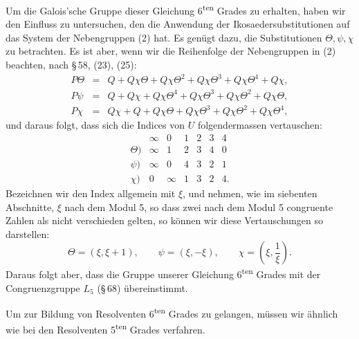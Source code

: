 \documentclass[11pt]{article}
\begin{document}
Um die Galois'sche Gruppe dieser Gleichung 6\textsuperscript{ten} Grades zu erhalten, haben wir den Einfluss zu untersuchen, den die Anwendung der Ikosaedersubstitutionen auf das System der Nebengruppen (2) hat. Es genügt dazu, die Substitutionen \(\Theta,\psi,\chi\) zu betrachten. Es ist aber, wenn wir die Reihenfolge der Nebengruppen in (2) beachten, nach \S\,58, (23), (25):
\[
\begin{array}{rcl}
P\Theta&=&Q+Q\chi\Theta+Q\chi\Theta^2+Q\chi\Theta^3+Q\chi\Theta^4+Q\chi,\\
P\psi&=&Q+Q\chi+Q\chi\Theta^4+Q\chi\Theta^3+Q\chi\Theta^2+Q\chi\Theta,\\
P\chi&=&Q\chi+Q+Q\chi\Theta+Q\chi\Theta^3+Q\chi\Theta^2+Q\chi\Theta^4,
\end{array}
\]
und daraus folgt, dass sich die Indices von \(U\) folgendermassen vertauschen:
\[
\begin{array}{c|rrrrrr}
&\infty&0&1&2&3&4\\\hline
\Theta)&\infty&1&2&3&4&0\\
\psi)&\infty&0&4&3&2&1\\
\chi)&0&\infty&1&3&2&4.
\end{array}
\]
Bezeichnen wir den Index allgemein mit \(\xi\), und nehmen, wie im siebenten Abschnitte, \(\xi\) nach dem Modul 5, so dass zwei nach dem Modul 5 congruente Zahlen als nicht verschieden gelten, so können wir diese Vertauschungen so darstellen:
\[
\Theta=(\xi,\xi+1),
\qquad
\psi=(\xi,-\xi),
\qquad
\chi=\left(\xi,\frac1\xi\right).
\]
Daraus folgt aber, dass die Gruppe unserer Gleichung 6\textsuperscript{ten} Grades mit der Congruenzgruppe \(L_5\) (\S\,68) übereinstimmt.

Um zur Bildung von Resolventen 6\textsuperscript{ten} Grades zu gelangen, müssen wir ähnlich wie bei den Resolventen 5\textsuperscript{ten} Grades verfahren.
\end{document}
